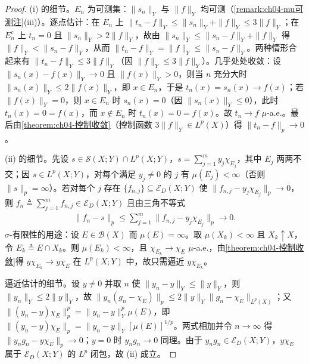 \documentclass[../../main.tex]{subfiles}%
\begin{document}
\begin{proof}
(i) 的细节。$E_n$ 为可测集：$\|s_n\|_Y$ 与 $\|f\|_Y$ 均可测（\cref{remark:ch04-mu可测注}(iii)）。逐点估计：在 $E_n$ 上 $\|t_n-f\|_Y\leqslant\|s_n\|_Y+\|f\|_Y\leqslant3\|f\|_Y$；在 $E_n^c$ 上 $t_n=0$ 且 $\|s_n\|_Y>2\|f\|_Y$，故由 $\|s_n\|_Y\leqslant\|s_n-f\|_Y+\|f\|_Y$ 得 $\|f\|_Y<\|s_n-f\|_Y$，从而 $\|t_n-f\|_Y=\|f\|_Y\leqslant\|s_n-f\|_Y$。两种情形合起来有 $\|t_n-f\|_Y\leqslant3\|f\|_Y$（因 $\|f\|_Y\leqslant3\|f\|_Y$）。几乎处处收敛：设 $\|s_n(x)-f(x)\|_Y\to0$ 且 $\|f(x)\|_Y>0$，则当 $n$ 充分大时 $\|s_n(x)\|_Y\leqslant2\|f(x)\|_Y$，即 $x\in E_n$，于是 $t_n(x)=s_n(x)\to f(x)$；若 $\|f(x)\|_Y=0$，则 $x\in E_n$ 时 $s_n(x)=0$（因 $\|s_n(x)\|_Y\leqslant0$），此时 $t_n(x)=0=f(x)$，而 $x\notin E_n$ 时 $t_n(x)=0=f(x)$。故 $t_n\to f$ $\mu$-a.e.。最后由\cref{theorem:ch04-控制收敛}（控制函数 $3\|f\|_Y\in L^p(X)$）得 $\|t_n-f\|_p\to0$。

(ii) 的细节。先设 $s\in\mathcal{S}(X;Y)\cap L^p(X;Y)$，$s=\sum_{j=1}^m y_j\chi_{E_j}$，其中 $E_j$ 两两不交；因 $s\in L^p(X;Y)$，对每个满足 $y_j\neq0$ 的 $j$ 有 $\mu(E_j)<\infty$（否则 $\|s\|_p=\infty$）。若对每个 $j$ 存在 $\{f_{n,j}\}\subseteq\mathcal{E}_D(X;Y)$ 使 $\|f_{n,j}-y_j\chi_{E_j}\|_p\to0$，则 $f_n\triangleq\sum_{j=1}^m f_{n,j}\in\mathcal{E}_D(X;Y)$ 且由三角不等式
\begin{align*}
\|f_n-s\|_p\leqslant\sum_{j=1}^m\|f_{n,j}-y_j\chi_{E_j}\|_p\to0 .
\end{align*}
$\sigma$-有限性的用途：设 $E\in\mathcal{B}(X)$ 而 $\mu(E)=\infty$。取 $\mu(X_k)<\infty$ 且 $X_k\uparrow X$，令 $E_k\triangleq E\cap X_k$。则 $\mu(E_k)<\infty$，且 $\chi_{E_k}\to\chi_E$ $\mu$-a.e.，由\cref{theorem:ch04-控制收敛}得 $y\chi_{E_k}\to y\chi_E$ 在 $L^p(X;Y)$ 中，故只需逼近 $y\chi_{E_k}$。

逼近估计的细节。设 $y\neq0$ 并取 $n$ 使 $\|y_n-y\|_Y\leqslant\|y\|_Y$，则 $\|y_n\|_Y\leqslant2\|y\|_Y$，故 $\|y_n(g_n-\chi_E)\|_p\leqslant2\|y\|_Y\|g_n-\chi_E\|_{L^p(X)}$；又 $\|(y_n-y)\chi_E\|_p^p=\|y_n-y\|_Y^p\mu(E)$，即 $\|(y_n-y)\chi_E\|_p=\|y_n-y\|_Y[\mu(E)]^{1/p}$。两式相加并令 $n\to\infty$ 得 $\|y_ng_n-y\chi_E\|_p\to0$；$y=0$ 时 $y_ng_n\to0$ 同理。由于 $y_ng_n\in\mathcal{E}_D(X;Y)$，$y\chi_E$ 属于 $\mathcal{E}_D(X;Y)$ 的 $L^p$ 闭包，故 (ii) 成立。
\end{proof}
\end{document}
